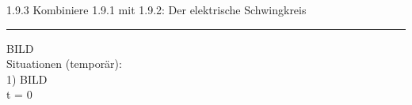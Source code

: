 \documentclass[a4paper,12pt]{report}
\begin{document}
	\noindent
	\Large
	1.9.3 Kombiniere 1.9.1 mit 1.9.2: Der elektrische Schwingkreis
	\hrule
	\large
	\vspace{1cm}
	\noindent
	BILD \\
	Situationen (temporär): \\
	1)
	BILD
	\\
	t = 0 \\\\
\end{document}

